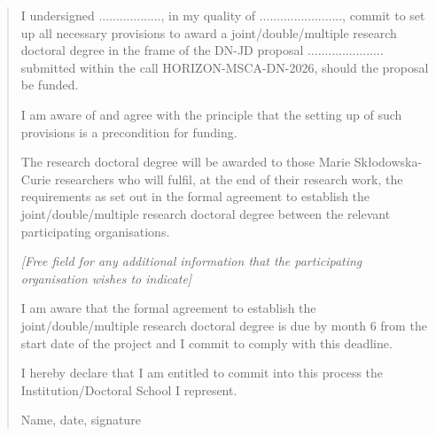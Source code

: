 \begin{quote}

I undersigned .................., in my quality of ........................, commit to set up all necessary provisions to award a joint/double/multiple research doctoral degree in the frame of the DN-JD proposal ......................  submitted within the call HORIZON-MSCA-DN-2026, should the proposal be funded.

I am aware of and agree with the principle that the setting up of such provisions is a precondition for funding.

The research doctoral degree will be awarded to those Marie Skłodowska-Curie researchers who will fulfil, at the end of their research work, the requirements as set out in the formal agreement to establish the joint/double/multiple research doctoral degree between the relevant participating organisations.

\textit{[Free field for any additional information that the participating organisation wishes to indicate]}

I am aware that the formal agreement to establish the joint/double/multiple research doctoral degree is due by month 6 from the start date of the project and I commit to comply with this deadline.

I hereby declare that I am entitled to commit into this process the Institution/Doctoral School I represent.

\bigskip
Name, date, signature
\end{quote}

%
